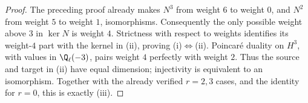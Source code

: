 \begin{proof}
The preceding proof already makes $N^3$ from weight $6$ to weight
$0$, and $N^2$ from weight $5$ to weight $1$, isomorphisms.
Consequently the only possible weight above $3$ in $\ker N$ is
weight $4$.  Strictness with respect to weights identifies its
weight-$4$ part with the kernel in (ii), proving (i)$\Leftrightarrow$(ii).
Poincar\'e duality on $H^3$, with values in $\Q_\ell(-3)$, pairs
weight $4$ perfectly with weight $2$.  Thus the source and target
in (ii) have equal dimension; injectivity is equivalent to an
isomorphism.  Together with the already verified $r=2,3$ cases,
and the identity for $r=0$, this is exactly (iii).
\end{proof}

